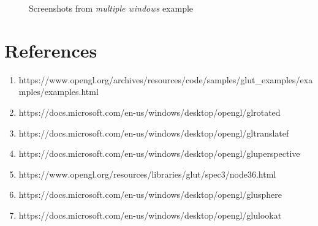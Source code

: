 \documentclass[11pt,a4paper,oneside]{article}
\begin{document}
   	\begin{figure}[!htbp]%
   	\centering
   	   	\qquad
   	   	\qquad
   	\caption{Screenshots from \emph{multiple windows} example}
   	\label{fig:multiple2}%
   	\end{figure}
   
 
	
    \section{References}
    \begin{enumerate}
    	\item https://www.opengl.org/archives/resources/code/samples/glut\_examples/examples/examples.html
    	\item https://docs.microsoft.com/en-us/windows/desktop/opengl/glrotated
    	\item https://docs.microsoft.com/en-us/windows/desktop/opengl/gltranslatef
    	\item https://docs.microsoft.com/en-us/windows/desktop/opengl/gluperspective
    	\item https://www.opengl.org/resources/libraries/glut/spec3/node36.html	
    	\item https://docs.microsoft.com/en-us/windows/desktop/opengl/glusphere
    	\item https://docs.microsoft.com/en-us/windows/desktop/opengl/glulookat
    \end{enumerate}
 

    
\end{document}
